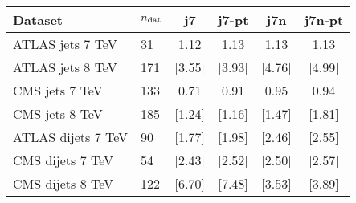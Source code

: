 \begin{tabularx}{\textwidth}{Xlcccc}
Dataset              & $n_{\rm dat}$ & j7  & j7-pt
                     & j7n  & j7n-pt \\
\toprule
ATLAS jets 7 TeV     & 31          &  1.12  &  1.13  &  1.13  &  1.13         \\     
ATLAS jets 8 TeV     & 171         & [3.55] & [3.93] & [4.76] & [4.99]        \\ 
CMS jets 7 TeV       & 133         &  0.71  &  0.91  &  0.95  &  0.94         \\
CMS jets 8 TeV       & 185         & [1.24] & [1.16] & [1.47] & [1.81]        \\    
\midrule
ATLAS dijets 7 TeV   &  90         & [1.77] & [1.98] & [2.46] & [2.55]       \\    
CMS dijets 7 TeV     &  54         & [2.43] & [2.52] & [2.50] & [2.57]       \\    
CMS dijets 8 TeV     & 122         & [6.70] & [7.48] & [3.53] & [3.89]       \\       
\bottomrule
\end{tabularx}

